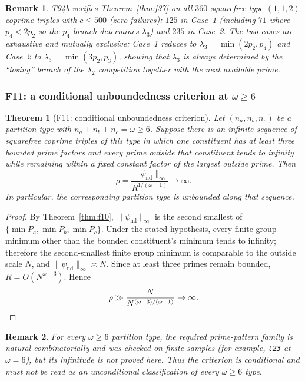 \documentclass[12pt]{article}
\newtheorem{theorem}{Theorem}
\newtheorem{remark}{Remark}
\theoremstyle{definition}
\begin{document}
\begin{remark}
  T94b verifies Theorem~\ref{thm:f37} on all $360$ squarefree type-$(1,1,2)$ coprime
  triples with $c \le 500$ (zero failures): $125$ in Case~1 (including $71$ where
  $p_4 < 2p_2$ so the $p_4$-branch determines $\lambda_3$) and $235$ in Case~2.
  The two cases are exhaustive and mutually exclusive; Case~1 reduces to
  $\lambda_3 = \min(2p_2, p_4)$ and Case~2 to $\lambda_3 = \min(3p_2, p_3)$,
  showing that $\lambda_3$ is always determined by the ``losing'' branch of the
  $\lambda_2$ competition together with the next available prime.
\end{remark}

\subsubsection*{F11: a conditional unboundedness criterion at $\omega\ge6$}

\begin{theorem}[F11: conditional unboundedness criterion]\label{thm:f11}
Let $(n_a,n_b,n_c)$ be a partition type with $n_a+n_b+n_c=\omega\ge6$.
Suppose there is an infinite sequence of squarefree coprime triples of this
type in which one constituent has at least three bounded prime factors and
every prime outside that constituent tends to infinity while remaining within
a fixed constant factor of the largest outside prime.  Then
\[
  \rho=\frac{\|\psi_\mathrm{nd}\|_\infty}{R^{1/(\omega-1)}}\to\infty.
\]
In particular, the corresponding partition type is unbounded along that sequence.
\end{theorem}

\begin{proof}
By Theorem~\ref{thm:f10}, $\|\psi_\mathrm{nd}\|_\infty$ is the second smallest of
$\{\min P_a,\min P_b,\min P_c\}$.  Under the stated hypothesis, every finite
group minimum other than the bounded constituent's minimum tends to infinity;
therefore the second-smallest finite group minimum is comparable to the outside
scale $N$, and $\|\psi_\mathrm{nd}\|_\infty\asymp N$.  Since at least three
primes remain bounded, $R=O(N^{\omega-3})$.  Hence
\[
  \rho\gg
  \frac{N}{N^{(\omega-3)/(\omega-1)}}\to\infty. \qedhere
\]
\end{proof}

\begin{remark}
For every $\omega\ge6$ partition type, the required prime-pattern family is
natural combinatorially and was checked on finite samples (for example,
\texttt{t23} at $\omega=6$), but its infinitude is not proved here.  Thus the
criterion is conditional and must not be read as an unconditional classification
of every $\omega\ge6$ type.
\end{remark}
\end{document}
